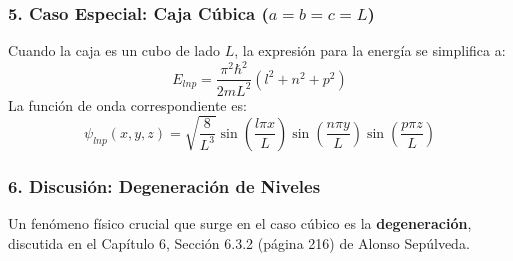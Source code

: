 \documentclass[a4paper]{article}
\begin{document}
\subsubsection{5. Caso Especial: Caja Cúbica ($a = b = c = L$)}

Cuando la caja es un cubo de lado $L$, la expresión para la energía se simplifica a:
\begin{equation}
E_{lnp} = \frac{\pi^2 \hbar^2}{2mL^2} \left( l^2 + n^2 + p^2 \right)
\label{eq:energy_cube}
\end{equation}
La función de onda correspondiente es:
\begin{equation}
\psi_{lnp}(x, y, z) = \sqrt{\frac{8}{L^3}} \sin\left(\frac{l\pi x}{L}\right) \sin\left(\frac{n\pi y}{L}\right) \sin\left(\frac{p\pi z}{L}\right)
\end{equation}

\subsubsection{6. Discusión: Degeneración de Niveles}

Un fenómeno físico crucial que surge en el caso cúbico es la \textbf{degeneración}, discutida en el Capítulo 6, Sección 6.3.2 (página 216) de Alonso Sepúlveda.
\end{document}
